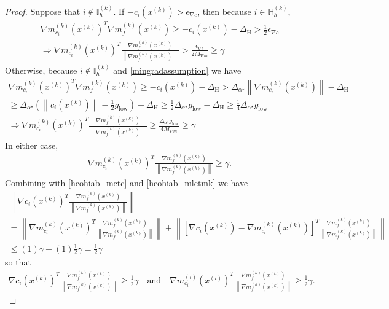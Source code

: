 \documentclass{article}
\theoremstyle{case}
\numberwithin{theorem}{subsection}
\newcommand{\gk}{{\nabla m_f^{(k)}\left(\xk\right)}}
\newcommand{\gmcik}{{\nabla m_{c_i}^{(k)}\left(\xk\right)}}
\newcommand{\gmcil}{{\nabla m_{c_i}^{(l)}\left(\xl\right)}}
\newcommand{\minangledelta}{{\Delta_{\alpha^{\star}}}}
\newcommand{\mingradepsilon}{{\epsilon_{\nabla c}}}
\newcommand{\mingrad}{{ g_{\textrm{low}} }}
\newcommand{\xk}{x^{(k)}}
\newcommand{\xl}{{x^{(l)}}}
\newcommand{\maxmodelgrad}{{M_{\nabla m}}}
\newcommand{\activeindicesk}{{ \mathbb I_h^{(k)} }}
\newcommand{\huffindicesk}{{ \mathbb H_h^{(k)} }}
\newcommand{\huffthreshold}{{\Delta_{\textrm{H}}}}
\begin{document}
\begin{proof}
Suppose that $i \not \in \activeindicesk$.
If $-c_i\left(\xk\right) > \mingradepsilon$, then because $i \in \huffindicesk$, 
\begin{align*}
\gmcik^T\gk \ge -c_i\left(\xk\right) - \huffthreshold > \frac 1 2 \mingradepsilon \\
\Longrightarrow \gmcik^T\frac{\gk}{\left\|\gk\right\|} > \frac{\mingradepsilon}{2\maxmodelgrad} \ge \gamma
\end{align*}
Otherwise, because $i \not \in \activeindicesk$ and \cref{mingradassumption} we have
\begin{align*}
\gmcik^T\gk \ge -c_i\left(\xk\right) - \huffthreshold
> \minangledelta \left\|\gmcik\right\| - \huffthreshold \\
\ge \minangledelta\left(\left\|c_i\left(\xk\right)\right\| - \frac 1 2 \mingrad \right) - \huffthreshold
\ge  \frac 1 2 \minangledelta \mingrad - \huffthreshold 
\ge \frac 1 4 \minangledelta \mingrad \\
\Longrightarrow 
\gmcik^T\frac{\gk}{\left\|\gk\right\|} \ge \frac {\minangledelta \mingrad} {4\maxmodelgrad}  \ge \gamma
\end{align*}
In either case,
\begin{align*}
\gmcik^T\frac{\gk}{\left\|\gk\right\|} \ge \gamma.
\end{align*}
Combining with \cref{hcohiab_mctc} and \cref{hcohiab_mlctmk} we have
\begin{align*}
\left\|\nabla c_i\left(\xk\right)^T\frac{\gk}{\left\|\gk\right\|}\right\| \\
= \left\|\gmcik^T\frac{\gk}{\left\|\gk\right\|} \right\|
+ \left\|\left[\nabla c_i\left(\xk\right) - \gmcik\right]^T\frac{\gk}{\left\|\gk\right\|}\right\| \\
\le (1) \gamma - (1) \frac 1 2 \gamma = \frac 1 2 \gamma
\end{align*}
so that
\begin{align*}
\nabla c_i\left(\xk\right)^T\frac{\gk}{\left\|\gk\right\|} \ge \frac 1 2 \gamma
\quad \textrm{and} \quad 
\gmcil^T\frac{\gk}{\left\|\gk\right\|} \ge \frac 1 2 \gamma.
\end{align*}


\end{proof}
\end{document}
